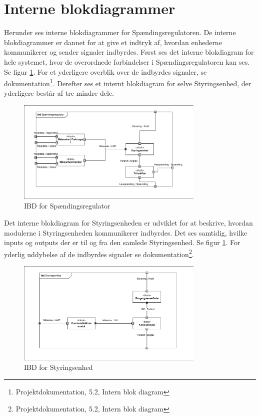 

\section{Interne blokdiagrammer}

Herunder ses interne blokdiagrammer for Spændingsregulatoren. De interne blokdiagrammer er dannet for at give et indtryk af, hvordan enhederne kommunikerer og sender signaler indbyrdes. Først ses det interne blokdiagram for hele systemet, hvor de overordnede forbindelser i Spændingsregulatoren kan ses. Se figur \ref{fig:IBDSp}. For et yderligere overblik over de indbyrdes signaler, se dokumentation\footnote{Projektdokumentation, 5.2, Intern blok diagram}.  Derefter ses et internt blokdiagram for selve Styringsenhed, der yderligere består af tre mindre dele. 

\begin{figure}[htbp] %
	\centering
	\includegraphics[width=0.8\textwidth]{figure/IBDSpaendingsregulator.pdf}
	\caption{IBD for Spændingsregulator}
	\label{fig:IBDSp}
\end{figure}

Det interne blokdiagram for Styringsenheden er udviklet for at beskrive, hvordan modulerne i Styringsenheden kommunikerer indbyrdes. Det ses samtidig, hvilke inputs og outputs der er til og fra den samlede Styringsenhed. Se figur \ref{fig:IBDSp}. For yderlig uddybelse af de indbyrdes signaler se dokumentation\footnote{Projektdokumentation, 5.2, Intern blok diagram}.


\begin{figure}[htbp] %
	\centering
	\includegraphics[width=0.8\textwidth]{figure/IBDStyringsenhed.pdf}
	\caption{IBD for Styringsenhed}
	\label{fig:IBDSt}
\end{figure}




